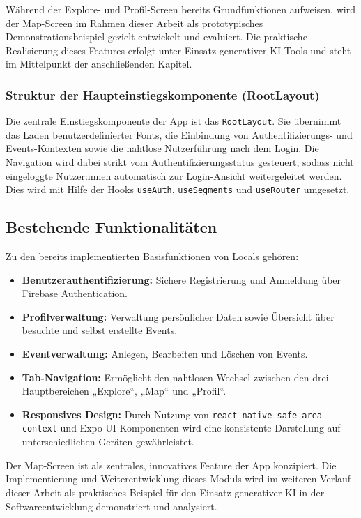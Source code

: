 Während der Explore- und Profil-Screen bereits Grundfunktionen aufweisen, wird
der Map-Screen im Rahmen dieser Arbeit als prototypisches
Demonstrationsbeispiel gezielt entwickelt und evaluiert. Die praktische
Realisierung dieses Features erfolgt unter Einsatz generativer KI-Tools und
steht im Mittelpunkt der anschließenden Kapitel.

\subsubsection{Struktur der Haupteinstiegskomponente (RootLayout)}
Die zentrale Einstiegskomponente der App ist das \texttt{RootLayout}. Sie
übernimmt das Laden benutzerdefinierter Fonts, die Einbindung von
Authentifizierungs- und Events-Kontexten sowie die nahtlose Nutzerführung nach
dem Login. Die Navigation wird dabei strikt vom Authentifizierungsstatus
gesteuert, sodass nicht eingeloggte Nutzer:innen automatisch zur Login-Ansicht
weitergeleitet werden. Dies wird mit Hilfe der Hooks \texttt{useAuth},
\texttt{useSegments} und \texttt{useRouter} umgesetzt.

\subsection{Bestehende Funktionalitäten}
Zu den bereits implementierten Basisfunktionen von Locals gehören:
\begin{itemize}
    \item \textbf{Benutzerauthentifizierung:} Sichere Registrierung und Anmeldung über Firebase Authentication.
    \item \textbf{Profilverwaltung:} Verwaltung persönlicher Daten sowie Übersicht über besuchte und selbst erstellte Events.
    \item \textbf{Eventverwaltung:} Anlegen, Bearbeiten und Löschen von Events.
    \item \textbf{Tab-Navigation:} Ermöglicht den nahtlosen Wechsel zwischen den drei Hauptbereichen „Explore“, „Map“ und „Profil“.
    \item \textbf{Responsives Design:} Durch Nutzung von \texttt{react-native-safe-area-context} und Expo UI-Komponenten wird eine konsistente Darstellung auf unterschiedlichen Geräten gewährleistet.
\end{itemize}

Der Map-Screen ist als zentrales, innovatives Feature der App konzipiert. Die
Implementierung und Weiterentwicklung dieses Moduls wird im weiteren Verlauf
dieser Arbeit als praktisches Beispiel für den Einsatz generativer KI in der
Softwareentwicklung demonstriert und analysiert.
